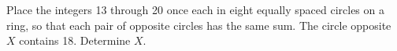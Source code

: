 Place the integers 13 through 20 once each in eight equally spaced circles on a ring, so that each pair of opposite circles has the same sum. The circle opposite $X$ contains 18. Determine $X$.
